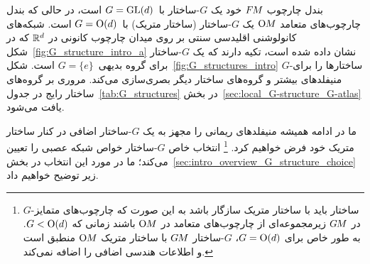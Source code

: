 بندل چارچوب $F\mkern-1.5muM$ خود یک $G$-ساختار با~${G=\operatorname{GL}(d)}$ است، در حالی که بندل چارچوب‌های متعامد $\operatorname{O}\mkern-3.6muM$ یک $G$-ساختار (ساختار متریک) با~${G=\operatorname{O}(d)}$ است.
شبکه‌های کانولوشنی اقلیدسی سنتی بر روی میدان چارچوب کانونی در $\mathbb{R}^d$ که در شکل~\ref{fig:G_structure_intro_a} نشان داده شده است، تکیه دارند که یک $G$-ساختار برای گروه بدیهی~${G=\{e\}}$ است.
شکل~\ref{fig:G_structures_intro} $G$-ساختارها را برای منیفلدهای بیشتر و گروه‌های ساختار دیگر بصری‌سازی می‌کند.
مروری بر گروه‌های ساختار رایج در جدول~\ref{tab:G_structures} در بخش~\ref{sec:local_G-structure_G-atlas} یافت می‌شود.


ما در ادامه همیشه منیفلدهای ریمانی را مجهز به یک $G$-ساختار اضافی در کنار ساختار متریک خود فرض خواهیم کرد.%
\footnote{
	$G$-ساختار باید با ساختار متریک سازگار باشد به این صورت که چارچوب‌های متمایز در $G\mkern-1.4muM$ زیرمجموعه‌ای از چارچوب‌های متعامد در $\operatorname{O}\mkern-3.6muM$ باشند زمانی که $G<\operatorname{O}(d)$.
	به طور خاص برای $G=\operatorname{O}(d)$، $G$-ساختار $G\mkern-1.4muM$ با ساختار متریک $\operatorname{O}\mkern-3.6muM$ منطبق است و اطلاعات هندسی اضافی را اضافه نمی‌کند.
}
انتخاب خاص $G$-ساختار خواص شبکه عصبی را تعیین می‌کند؛ ما در مورد این انتخاب در بخش~\ref{sec:intro_overview_G_structure_choice} زیر توضیح خواهیم داد.


